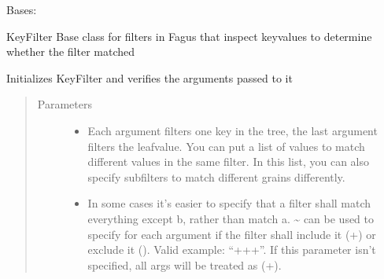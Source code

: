 \documentclass[a4paper,10pt,english]{sphinxmanual}
\begin{document}
\begin{fulllineitems}
\label{\detokenize{fagus.filters:fagus.filters.KFil}}
\pysigstartsignatures
{}
\pysigstopsignatures
\sphinxAtStartPar
Bases: {\hyperref[\detokenize{fagus.filters:fagus.filters.FilBase}]{}}

\sphinxAtStartPar
KeyFilter \sphinxhyphen{} Base class for filters in Fagus that inspect key\sphinxhyphen{}values to determine whether the filter matched

\begin{fulllineitems}
\label{\detokenize{fagus.filters:fagus.filters.KFil.__init__}}
\pysigstartsignatures
{}
\pysigstopsignatures
\sphinxAtStartPar
Initializes KeyFilter and verifies the arguments passed to it
\begin{quote}\begin{description}
\item[{Parameters}] \leavevmode\begin{itemize}
\item {}
\sphinxAtStartPar
{} \textendash{} Each argument filters one key in the tree, the last argument filters the leaf\sphinxhyphen{}value. You can
put a list of values to match different values in the same filter. In this list, you can also specify
subfilters to match different grains differently.

\item {}
\sphinxAtStartPar
{} \textendash{} In some cases it’s easier to specify that a filter shall match everything except b, rather than
match a. \textasciitilde{} can be used to specify for each argument if the filter shall include it (+) or exclude it
(\sphinxhyphen{}). Valid example: “++\sphinxhyphen{}+”. If this parameter isn’t specified, all args will be treated as (+).


\end{itemize}
\end{description}
\end{quote}
\end{fulllineitems}
\end{fulllineitems}
\end{document}
